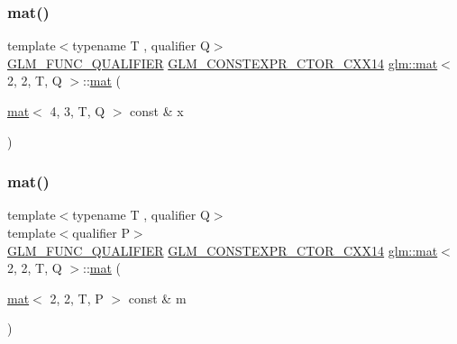 \mbox{\label{structglm_1_1mat_3_012_00_012_00_01_t_00_01_q_01_4_aece09f8eb654228f28ed992288a3919a}} 
\subsubsection{\texorpdfstring{mat()}{mat()}\hspace{0.1cm}{\footnotesize\ttfamily [17/21]}}
{\footnotesize\ttfamily template$<$typename T , qualifier Q$>$ \\
\hyperlink{setup_8hpp_a33fdea6f91c5f834105f7415e2a64407}{G\+L\+M\+\_\+\+F\+U\+N\+C\+\_\+\+Q\+U\+A\+L\+I\+F\+I\+ER} \hyperlink{setup_8hpp_a0900f9145e68bf6061b6f5e7be3fa751}{G\+L\+M\+\_\+\+C\+O\+N\+S\+T\+E\+X\+P\+R\+\_\+\+C\+T\+O\+R\+\_\+\+C\+X\+X14} \hyperlink{structglm_1_1mat}{glm\+::mat}$<$ 2, 2, T, Q $>$\+::\hyperlink{structglm_1_1mat}{mat} (\begin{DoxyParamCaption}\item[{\hyperlink{structglm_1_1mat}{mat}$<$ 4, 3, T, Q $>$ const \&}]{x }\end{DoxyParamCaption})}

\mbox{\label{structglm_1_1mat_3_012_00_012_00_01_t_00_01_q_01_4_a135dbb9a94e04066f09624c6f3ab3b53}} 
\subsubsection{\texorpdfstring{mat()}{mat()}\hspace{0.1cm}{\footnotesize\ttfamily [18/21]}}
{\footnotesize\ttfamily template$<$typename T , qualifier Q$>$ \\
template$<$qualifier P$>$ \\
\hyperlink{setup_8hpp_a33fdea6f91c5f834105f7415e2a64407}{G\+L\+M\+\_\+\+F\+U\+N\+C\+\_\+\+Q\+U\+A\+L\+I\+F\+I\+ER} \hyperlink{setup_8hpp_a0900f9145e68bf6061b6f5e7be3fa751}{G\+L\+M\+\_\+\+C\+O\+N\+S\+T\+E\+X\+P\+R\+\_\+\+C\+T\+O\+R\+\_\+\+C\+X\+X14} \hyperlink{structglm_1_1mat}{glm\+::mat}$<$ 2, 2, T, Q $>$\+::\hyperlink{structglm_1_1mat}{mat} (\begin{DoxyParamCaption}\item[{\hyperlink{structglm_1_1mat}{mat}$<$ 2, 2, T, P $>$ const \&}]{m }\end{DoxyParamCaption})}



